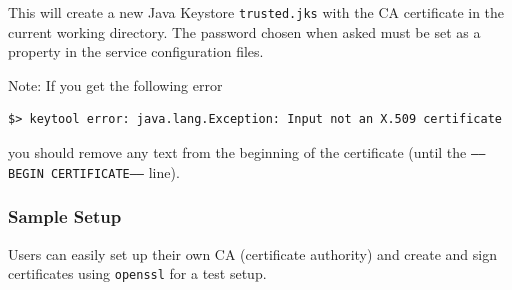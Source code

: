 \documentclass[a4paper,10pt]{book}
\begin{document}
This will create a new Java Keystore \texttt{trusted.jks} with the CA certificate in the current working directory. The password chosen when asked must be set as a property in the service configuration files.

Note: If you get the following error
\begin{verbatim}
$> keytool error: java.lang.Exception: Input not an X.509 certificate
\end{verbatim}
you should remove any text from the beginning of the certificate (until the \texttt{-----BEGIN CERTIFICATE-----} line).


\subsubsection{Sample Setup}

Users can easily set up their own CA (certificate authority) and create and sign certificates using \texttt{openssl} for a test setup.
\end{document}
